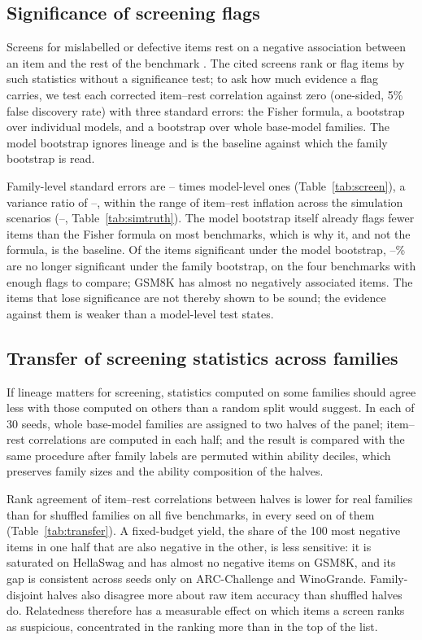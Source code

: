 \documentclass[10pt]{article}
\theoremstyle{remark}\newtheorem{remark}{Remark}
\begin{document}
\subsection{Significance of screening flags}\label{sec:screening}
Screens for mislabelled or defective items rest on a negative association
between an item and the rest of the benchmark
\citep{truong2025fantastic,land2026auditing}. The cited screens rank or flag
items by such statistics without a significance test; to ask how much evidence
a flag carries, we test each corrected item--rest correlation against zero
(one-sided, 5\% false discovery rate) with three standard errors: the Fisher
formula, a bootstrap over individual models, and a bootstrap over whole
base-model families. The model bootstrap ignores lineage and is the baseline
against which the family bootstrap is read.

Family-level standard errors are \ScreenSEMin--\ScreenSEMax{} times
model-level ones (Table~\ref{tab:screen}), a variance ratio of
\ScreenVarMin--\ScreenVarMax, within the range of item--rest inflation across
the simulation scenarios (\SimItemRestMin--\SimItemRestMax,
Table~\ref{tab:simtruth}). The model bootstrap itself already flags fewer
items than the Fisher formula on most benchmarks, which is why it, and not the
formula, is the baseline. Of the items significant under the model bootstrap,
\ScreenLostMin--\ScreenLostMax\% are no longer significant under the family
bootstrap, on the four benchmarks with enough flags to compare; GSM8K has
almost no negatively associated items.
The items that lose significance are not thereby shown to be sound; the
evidence against them is weaker than a model-level test states.

\subsection{Transfer of screening statistics across families}\label{sec:transfer}
If lineage matters for screening, statistics computed on some families should
agree less with those computed on others than a random split would suggest.
In each of 30 seeds, whole base-model families are assigned to two halves of
the panel; item--rest correlations are computed in each half; and the result
is compared with the same procedure after family labels are permuted within
ability deciles, which preserves family sizes and the ability composition of
the halves.


Rank agreement of item--rest correlations between halves is lower for real
families than for shuffled families on all five benchmarks, in every seed on
\TransferRankAllSeeds{} of them (Table~\ref{tab:transfer}). A fixed-budget
yield, the share of the 100 most negative items in one half that are also
negative in the other, is less sensitive: it is saturated on HellaSwag and has
almost no negative items on GSM8K, and its gap is consistent across seeds only
on ARC-Challenge and WinoGrande. Family-disjoint halves also disagree more
about raw item accuracy than shuffled halves do. Relatedness therefore has a
measurable effect on which items a screen ranks as suspicious, concentrated in
the ranking more than in the top of the list.
\end{document}
